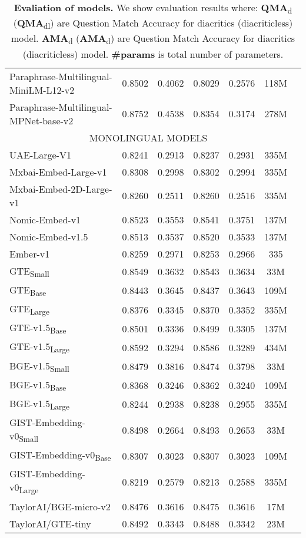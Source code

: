 \begin{table*}[ht!]
\begin{tabular}{lcccccc}
      Paraphrase-Multilingual-MiniLM-L12-v2 & 0.8502 & 0.4062 & 0.8029 & 0.2576 & 118M \\
      Paraphrase-Multilingual-MPNet-base-v2 & 0.8752 & 0.4538 & 0.8354 & 0.3174 & 278M \\
      \hline
      \multicolumn{6}{c}{MONOLINGUAL MODELS} \\
      \hline
      UAE-Large-V1 & 0.8241 & 0.2913 & 0.8237 & 0.2931 & 335M \\
      Mxbai-Embed-Large-v1 & 0.8308 & 0.2998 & 0.8302 & 0.2994 & 335M \\
      Mxbai-Embed-2D-Large-v1 & 0.8260 & 0.2511 & 0.8260 & 0.2516 & 335M \\
      Nomic-Embed-v1 & 0.8523 & 0.3553 & 0.8541 & 0.3751 & 137M \\
      Nomic-Embed-v1.5 & 0.8513 & 0.3537 & 0.8520 & 0.3533 & 137M \\
      Ember-v1 & 0.8259 & 0.2971 & 0.8253 & 0.2966 & 335 \\
      GTE\textsubscript{Small} & 0.8549 & 0.3632 & 0.8543 & 0.3634 & 33M \\
      GTE\textsubscript{Base} & 0.8443 & 0.3645 & 0.8437 & 0.3643 & 109M \\
      GTE\textsubscript{Large} & 0.8376 & 0.3345 & 0.8370 & 0.3352 & 335M \\
      GTE-v1.5\textsubscript{Base} & 0.8501 & 0.3336 & 0.8499 & 0.3305 & 137M \\
      GTE-v1.5\textsubscript{Large} & 0.8592 & 0.3294 & 0.8586 & 0.3289 & 434M \\
      BGE-v1.5\textsubscript{Small} & 0.8479 & 0.3816 & 0.8474 & 0.3798 & 33M \\
      BGE-v1.5\textsubscript{Base} & 0.8368 & 0.3246 & 0.8362 & 0.3240 & 109M \\
      BGE-v1.5\textsubscript{Large} & 0.8244 & 0.2938 & 0.8238 & 0.2955 & 335M \\
      GIST-Embedding-v0\textsubscript{Small} & 0.8498 & 0.2664 & 0.8493 & 0.2653 & 33M \\
      GIST-Embedding-v0\textsubscript{Base} & 0.8307 & 0.3023 & 0.8307 & 0.3023 & 109M \\
      GIST-Embedding-v0\textsubscript{Large} & 0.8219 & 0.2579 & 0.8213 & 0.2588 & 335M \\
      TaylorAI/BGE-micro-v2 & 0.8476 & 0.3616 & 0.8475 & 0.3616 & 17M \\
      TaylorAI/GTE-tiny & 0.8492 & 0.3343 & 0.8488 & 0.3342 & 23M \\
      \bottomrule
    \end{tabular}
    \caption{\textbf{Evaliation of models.}
    We show evaluation results where:
    \textbf{QMA}\textsubscript{d} (\textbf{QMA}\textsubscript{dl}) are Question Match Accuracy for diacritics (diacriticless) model.
    \textbf{AMA}\textsubscript{d} (\textbf{AMA}\textsubscript{d}) are Question Match Accuracy for diacritics (diacriticless) model.
    \textbf{\#params} is total number of parameters.}
    \label{tab:evaluatinon}
  \end{table*}
  